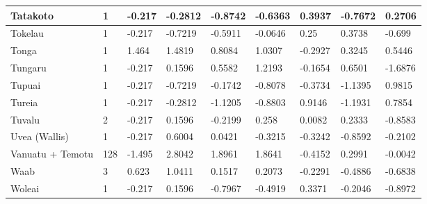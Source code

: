 \documentclass[a4paper,10pt]{article} %
\begin{document}
\begin{landscape}
\begin{longtable}{| p{2.6cm} |  p{1cm} | p{1.2cm}  | p{1.9cm}  | p{1.7cm}  | p{1.7cm}  | p{1.7cm}  | p{1.6cm} | p{1.5cm}   |}
Tatakoto&1&-0.217&-0.2812&-0.8742&-0.6363&0.3937&-0.7672&0.2706\\ \hline
Tokelau&1&-0.217&-0.7219&-0.5911&-0.0646&0.25&0.3738&-0.699\\ \hline
Tonga&1&1.464&1.4819&0.8084&1.0307&-0.2927&0.3245&0.5446\\ \hline
Tungaru&1&-0.217&0.1596&0.5582&1.2193&-0.1654&0.6501&-1.6876\\ \hline
Tupuai&1&-0.217&-0.7219&-0.1742&-0.8078&-0.3734&-1.1395&0.9815\\ \hline
Tureia&1&-0.217&-0.2812&-1.1205&-0.8803&0.9146&-1.1931&0.7854\\ \hline
Tuvalu&2&-0.217&0.1596&-0.2199&0.258&0.0082&0.2333&-0.8583\\ \hline
Uvea (Wallis)&1&-0.217&0.6004&0.0421&-0.3215&-0.3242&-0.8592&-0.2102\\ \hline
Vanuatu + Temotu&128&-1.495&2.8042&1.8961&1.8641&-0.4152&0.2991&-0.0042\\ \hline
Waab&3&0.623&1.0411&0.1517&0.2073&-0.2291&-0.4886&-0.6838\\ \hline
Woleai&1&-0.217&0.1596&-0.7967&-0.4919&0.3371&-0.2046&-0.8972\\ \hline

 \end{longtable}
\end{landscape}
\newpage
\end{document}
